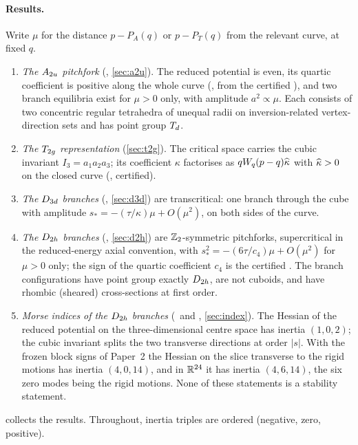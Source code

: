 \paragraph{Results.} Write $\mu$ for the distance $p-P_A(q)$ or $p-P_T(q)$ from the relevant curve, at fixed $q$.
\begin{enumerate}[label=(\roman*)]
\item \emph{The $A_{2u}$ pitchfork} (\thmA, \cref{sec:a2u}). The reduced potential is even, its quartic coefficient
is positive along the whole curve (\corM, from the certified \lemM), and two branch equilibria exist for $\mu>0$
only, with amplitude $a^2\propto\mu$. Each consists of two concentric regular tetrahedra of unequal radii on
inversion-related vertex-direction sets and has point group $T_{d}$.
\item \emph{The $T_{2g}$ representation} (\cref{sec:t2g}). The critical space carries the cubic invariant
$I_3=a_1a_2a_3$; its coefficient $\kappa$ factorises as $qW_q(p-q)\widehat{\kappa}$ with $\widehat{\kappa}>0$ on the closed curve
(\lemK, certified).
\item \emph{The $D_{3d}$ branches} (\propBone, \cref{sec:d3d}) are transcritical: one branch through the cube with
amplitude $s_*=-(\tau/\kappa)\mu+O(\mu^2)$, on both sides of the curve.
\item \emph{The $D_{2h}$ branches} (\propBtwo, \cref{sec:d2h}) are $\mathbb{Z}_2$-symmetric pitchforks, supercritical in the
reduced-energy axial convention, with $s_*^2=-(6\tau/c_4)\mu+O(\mu^2)$ for $\mu>0$ only; the sign of the quartic
coefficient $c_4$ is the certified \lemQ. The branch configurations have point group exactly $D_{2h}$, are not
cuboids, and have rhombic (sheared) cross-sections at first order.
\item \emph{Morse indices of the $D_{2h}$ branches} (\propBthree\ and \corBthree, \cref{sec:index}). The Hessian of the
reduced potential on the three-dimensional centre space has inertia $(1,0,2)$; the cubic invariant splits the two
transverse directions at order $|s|$. With the frozen block signs of Paper~2 the Hessian on the slice transverse to
the rigid motions has inertia $(4,0,14)$, and in $\mathbb{R}^{24}$ it has inertia $(4,6,14)$, the six zero modes being the
rigid motions. None of these statements is a stability statement.
\end{enumerate}
 collects the results. Throughout, inertia triples are ordered (negative, zero, positive).

